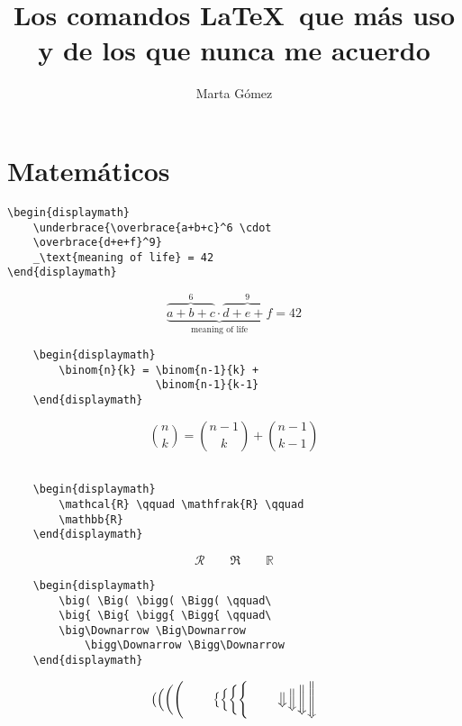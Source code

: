 \documentclass[10pt,spanish, landscape, twocolumn]{article}
\title{Los comandos \LaTeX\ que más uso y de los que nunca me acuerdo}
\author{Marta Gómez}
\begin{document}
\maketitle %

\section{Matemáticos}

\begin{verbatim}
\begin{displaymath}
    \underbrace{\overbrace{a+b+c}^6 \cdot 
    \overbrace{d+e+f}^9}
    _\text{meaning of life} = 42
\end{displaymath}
\end{verbatim}

\begin{displaymath}
    \underbrace{\overbrace{a+b+c}^6 \cdot \overbrace{d+e+f}^9}_\text{meaning of life} = 42
\end{displaymath}

\begin{verbatim}
    \begin{displaymath}
        \binom{n}{k} = \binom{n-1}{k} + 
                       \binom{n-1}{k-1}
    \end{displaymath}
\end{verbatim}

\begin{displaymath}
    \binom{n}{k} = \binom{n-1}{k} + \binom{n-1}{k-1}
\end{displaymath}
\\

\begin{verbatim}
    \begin{displaymath}
        \mathcal{R} \qquad \mathfrak{R} \qquad 
        \mathbb{R}
    \end{displaymath}
\end{verbatim}

\begin{displaymath}
    \mathcal{R} \qquad \mathfrak{R} \qquad \mathbb{R}
\end{displaymath}

\begin{verbatim}
    \begin{displaymath}
        \big( \Big( \bigg( \Bigg( \qquad\
        \big{ \Big{ \bigg{ \Bigg{ \qquad\
        \big\Downarrow \Big\Downarrow 
            \bigg\Downarrow \Bigg\Downarrow
    \end{displaymath}
\end{verbatim}

\begin{displaymath}
    \big( \Big( \bigg( \Bigg( \qquad\
    \big\{ \Big\{ \bigg\{ \Bigg\{ \qquad\
    \big\Downarrow \Big\Downarrow 
        \bigg\Downarrow \Bigg\Downarrow
\end{displaymath}
\end{document}
